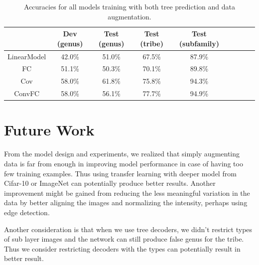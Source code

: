 \documentclass{article}
\begin{document}
\begin{table}[h]
\centering
\begin{tabular}{ |c|c|c|c|c|c|c|c|c| } 
\hline  
       	    &   Dev (genus) &   Test (genus) & Test (tribe) & Test (subfamily)	\\\hline\hline
LinearModel &  	42.0\%    	&  	51.0\%       &    67.5\%  	&  87.9\% 			\\
FC     		&   51.1\%   	&   50.3\%       &    70.1\%    &  89.8\%			\\
Cov    		&   58.0\%   	&   61.8\%       &    75.8\%   	&  94.3\%			\\
ConvFC 		&   58.0\%   	&   56.1\%       &    77.7\%    &  94.9\%			\\\hline
\end{tabular}
\caption{Accuracies for all models training with both tree prediction and data augmentation. }
\label{t2}
\end{table}

\section{Future Work}

From the model design and experiments, we realized that simply augmenting data is far from enough in improving model performance in case of having too few training examples. Thus using transfer learning with deeper model from Cifar-10 or ImageNet can potentially produce better results. Another improvement might be gained from reducing the less meaningful variation in the data by better aligning the images and normalizing the intensity, perhaps using edge detection.

Another consideration is that when we use tree decoders, we didn't restrict types of sub layer images and the network can still produce false genus for the tribe. Thus we consider restricting decoders with the types can potentially result in better result.



\end{document}
